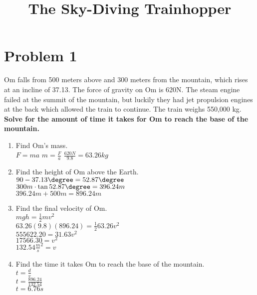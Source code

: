 \documentclass{article}
\title{\vspace{-3em}The Sky-Diving Trainhopper\vspace{-3em}}
\begin{document}
\fontsize{14}{16}\selectfont

\maketitle

\section{Problem 1}

Om falls from 500 meters above and 300 meters from the mountain, which rises at an incline of 37.13\degree. The force of gravity on Om is 620N. The steam engine failed at the summit of the mountain, but luckily they had jet propulsion engines at the back which allowed the train to continue. The train weighs 550,000 kg. \textbf{Solve for the amount of time it takes for Om to reach the base of the mountain.}

\begin{enumerate}
    \item Find Om's mass. \\
    \(F = ma\)
    \(m =\frac{F}{a}\)
    \(\frac{620N}{9.8}=63.26kg\)

    \item Find the height of Om above the Earth. \\
    \(90-37.13\degree = 52.87\degree\) \\
    \(300m \cdot \tan 52.87\degree = 396.24m\) \\
    \(396.24m + 500m = 896.24m\)

    \item Find the final velocity of Om. \\
    \(mgh = \frac{1}{2}mv^2\) \\
    \(63.26(9.8)(896.24) = \frac{1}{2}63.26v^2\) \\
    \(555622.20 = 31.63v^2\) \\
    \(17566.30 = v^2\) \\
    \(132.54\frac{m}{s}^2 = v\)

    \item Find the time it takes Om to reach the base of the mountain. \\
    \(t = \frac{d}{v}\) \\
    \(t = \frac{896.24}{132.54}\) \\
    \(t = 6.76s\)
\end{enumerate}
\end{document}
